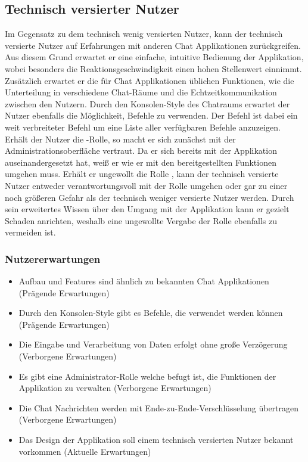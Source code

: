 \subsection{Technisch versierter Nutzer}
Im Gegensatz zu dem technisch wenig versierten Nutzer, kann der technisch versierte Nutzer auf Erfahrungen mit anderen Chat Applikationen zurückgreifen.
Aus diesem Grund erwartet er eine einfache, intuitive Bedienung der Applikation, wobei besonders die Reaktionsgeschwindigkeit einen hohen Stellenwert einnimmt.
Zusätzlich erwartet er die für Chat Applikationen üblichen Funktionen, wie die Unterteilung in verschiedene Chat-Räume und die Echtzeitkommunikation zwischen den Nutzern.
\newparagraph
Durch den Konsolen-Style des Chatraums erwartet der Nutzer ebenfalls die Möglichkeit, Befehle zu verwenden.
Der Befehl  ist dabei ein weit verbreiteter Befehl um eine Liste aller verfügbaren Befehle anzuzeigen.
\newparagraph
Erhält der Nutzer die -Rolle, so macht er sich zunächst mit der Administrationsoberfläche vertraut.
Da er sich bereits mit der Applikation auseinandergesetzt hat, weiß er wie er mit den bereitgestellten Funktionen umgehen muss.
Erhält er ungewollt die Rolle , kann der technisch versierte Nutzer entweder verantwortungsvoll mit der Rolle umgehen oder gar zu einer noch größeren Gefahr als der technisch weniger versierte Nutzer werden.
Durch sein erweitertes Wissen über den Umgang mit der Applikation kann er gezielt Schaden anrichten, weshalb eine ungewollte Vergabe der Rolle ebenfalls zu vermeiden ist.

\subsubsection{Nutzererwartungen}
\begin{itemize}
  \item Aufbau und Features sind ähnlich zu bekannten Chat Applikationen (Prägende Erwartungen)
  \item Durch den Konsolen-Style gibt es Befehle, die verwendet werden können (Prägende Erwartungen)
  \item Die Eingabe und Verarbeitung von Daten erfolgt ohne große Verzögerung (Verborgene Erwartungen)
  \item Es gibt eine Administrator-Rolle welche befugt ist, die Funktionen der Applikation zu verwalten (Verborgene Erwartungen)
  \item Die Chat Nachrichten werden mit Ende-zu-Ende-Verschlüsselung übertragen (Verborgene Erwartungen)
  \item Das Design der Applikation soll einem technisch versierten Nutzer bekannt vorkommen (Aktuelle Erwartungen)
\end{itemize}

